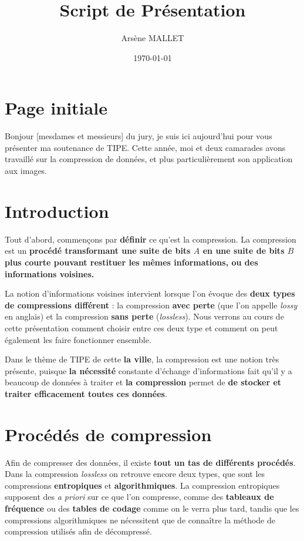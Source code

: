 \documentclass{article}
\title{Script de Pr\'esentation}
\date{\today}
\author{Arsène MALLET}
\begin{document}
\thispagestyle{firstpage}

\begin{center}
    \huge\bfseries{\@title}
\end{center}

\section{Page initiale}

Bonjour [mesdames et messieurs] du jury, je suis ici aujourd'hui pour vous
présenter ma soutenance de TIPE. Cette année, moi et deux camarades avons travaillé
sur la compression de données, et plus particulièrement son application aux images. 

\section{Introduction}

Tout d'abord, commençons par \textbf{définir} ce qu'est la compression. La compression
est un \textbf{procédé transformant une suite de bits $A$ en une suite de bits $B$ plus 
courte pouvant restituer les mêmes informations, ou des informations voisines.}

La notion d'informations voisines intervient lorsque l'on évoque des \textbf{deux types de compressions différent} :
la compression \textbf{avec perte} (que l'on appelle \textit{lossy} en anglais) et la compression \textbf{sans perte}
(\textit{lossless}). Nous verrons au cours de cette présentation comment choisir entre ces deux type et comment on peut
également les faire fonctionner ensemble.

Dans le thème de TIPE de cette \textbf{la ville}, la compression est une notion très présente, puisque
\textbf{la nécessité} constante d'échange d'informations fait qu'il y a beaucoup de données à traiter et
\textbf{la compression} permet de \textbf{de stocker et traiter efficacement toutes ces données}.

\section{Procédés de compression}

Afin de compresser des données, il existe \textbf{tout un tas de différents procédés}. Dans la compression
\textit{lossless} on retrouve encore deux types, que sont les compressions \textbf{entropiques} et \textbf{algorithmiques}.
La compression entropiques supposent des \textit{a priori} sur ce que l'on compresse, comme des \textbf{tableaux de fréquence}
ou des \textbf{tables de codage} comme on le verra plus tard, tandis que les compressions algorithmiques ne nécessitent que de connaître
la méthode de compression utilisés afin de décompressé.
\end{document}
